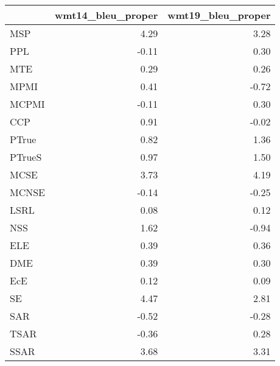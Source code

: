 \begin{tabular}{lrr}
\toprule
 & wmt14\_bleu\_proper & wmt19\_bleu\_proper \\
\midrule
MSP & 4.29 & 3.28 \\
PPL & -0.11 & 0.30 \\
MTE & 0.29 & 0.26 \\
MPMI & 0.41 & -0.72 \\
MCPMI & -0.11 & 0.30 \\
CCP & 0.91 & -0.02 \\
PTrue & 0.82 & 1.36 \\
PTrueS & 0.97 & 1.50 \\
MCSE & 3.73 & 4.19 \\
MCNSE & -0.14 & -0.25 \\
LSRL & 0.08 & 0.12 \\
NSS & 1.62 & -0.94 \\
ELE & 0.39 & 0.36 \\
DME & 0.39 & 0.30 \\
EcE & 0.12 & 0.09 \\
SE & 4.47 & 2.81 \\
SAR & -0.52 & -0.28 \\
TSAR & -0.36 & 0.28 \\
SSAR & 3.68 & 3.31 \\
\bottomrule
\end{tabular}
